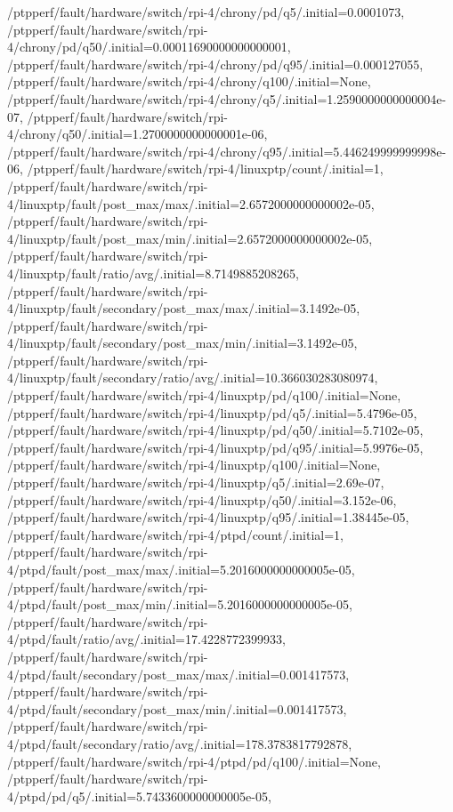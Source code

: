 {    /ptpperf/fault/hardware/switch/rpi-4/chrony/pd/q5/.initial=0.0001073,
    /ptpperf/fault/hardware/switch/rpi-4/chrony/pd/q50/.initial=0.00011690000000000001,
    /ptpperf/fault/hardware/switch/rpi-4/chrony/pd/q95/.initial=0.000127055,
    /ptpperf/fault/hardware/switch/rpi-4/chrony/q100/.initial=None,
    /ptpperf/fault/hardware/switch/rpi-4/chrony/q5/.initial=1.2590000000000004e-07,
    /ptpperf/fault/hardware/switch/rpi-4/chrony/q50/.initial=1.2700000000000001e-06,
    /ptpperf/fault/hardware/switch/rpi-4/chrony/q95/.initial=5.446249999999998e-06,
    /ptpperf/fault/hardware/switch/rpi-4/linuxptp/count/.initial=1,
    /ptpperf/fault/hardware/switch/rpi-4/linuxptp/fault/post_max/max/.initial=2.6572000000000002e-05,
    /ptpperf/fault/hardware/switch/rpi-4/linuxptp/fault/post_max/min/.initial=2.6572000000000002e-05,
    /ptpperf/fault/hardware/switch/rpi-4/linuxptp/fault/ratio/avg/.initial=8.7149885208265,
    /ptpperf/fault/hardware/switch/rpi-4/linuxptp/fault/secondary/post_max/max/.initial=3.1492e-05,
    /ptpperf/fault/hardware/switch/rpi-4/linuxptp/fault/secondary/post_max/min/.initial=3.1492e-05,
    /ptpperf/fault/hardware/switch/rpi-4/linuxptp/fault/secondary/ratio/avg/.initial=10.366030283080974,
    /ptpperf/fault/hardware/switch/rpi-4/linuxptp/pd/q100/.initial=None,
    /ptpperf/fault/hardware/switch/rpi-4/linuxptp/pd/q5/.initial=5.4796e-05,
    /ptpperf/fault/hardware/switch/rpi-4/linuxptp/pd/q50/.initial=5.7102e-05,
    /ptpperf/fault/hardware/switch/rpi-4/linuxptp/pd/q95/.initial=5.9976e-05,
    /ptpperf/fault/hardware/switch/rpi-4/linuxptp/q100/.initial=None,
    /ptpperf/fault/hardware/switch/rpi-4/linuxptp/q5/.initial=2.69e-07,
    /ptpperf/fault/hardware/switch/rpi-4/linuxptp/q50/.initial=3.152e-06,
    /ptpperf/fault/hardware/switch/rpi-4/linuxptp/q95/.initial=1.38445e-05,
    /ptpperf/fault/hardware/switch/rpi-4/ptpd/count/.initial=1,
    /ptpperf/fault/hardware/switch/rpi-4/ptpd/fault/post_max/max/.initial=5.2016000000000005e-05,
    /ptpperf/fault/hardware/switch/rpi-4/ptpd/fault/post_max/min/.initial=5.2016000000000005e-05,
    /ptpperf/fault/hardware/switch/rpi-4/ptpd/fault/ratio/avg/.initial=17.4228772399933,
    /ptpperf/fault/hardware/switch/rpi-4/ptpd/fault/secondary/post_max/max/.initial=0.001417573,
    /ptpperf/fault/hardware/switch/rpi-4/ptpd/fault/secondary/post_max/min/.initial=0.001417573,
    /ptpperf/fault/hardware/switch/rpi-4/ptpd/fault/secondary/ratio/avg/.initial=178.3783817792878,
    /ptpperf/fault/hardware/switch/rpi-4/ptpd/pd/q100/.initial=None,
    /ptpperf/fault/hardware/switch/rpi-4/ptpd/pd/q5/.initial=5.7433600000000005e-05,
}
